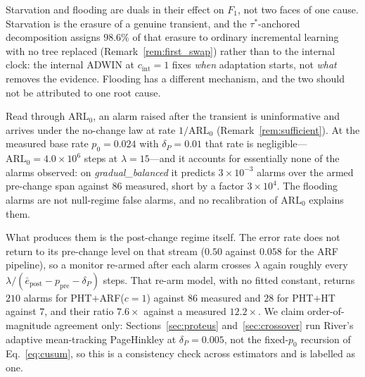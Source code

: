 \documentclass[smallextended]{svjour3}
\newcommand{\DeltaPtext}{0.01}               %
\newcommand{\LambdaFA}{15}                   %
\newcommand{\LearnSharePure}{98.6}           %
\newcommand{\PzeroMeas}{0.024}               %
\newcommand{\ArlFifteen}{4.0\times10^{6}}    %
\newcommand{\FloodPredArf}{210}              %
\newcommand{\FloodPredHt}{28}                %
\newcommand{\FloodArlGap}{3\times10^{4}}     %
\begin{document}
\begin{remark}\label{rem:flooding}
  Starvation and flooding are duals in their effect on $F_1$, not two faces of one cause. Starvation is the erasure of a genuine transient, and the $\tau^*$-anchored decomposition assigns $\LearnSharePure\%$ of that erasure to ordinary incremental learning with no tree replaced (Remark~\ref{rem:first_swap}) rather than to the internal clock: the internal ADWIN at $c_{\mathrm{int}}{=}1$ fixes \emph{when} adaptation starts, not \emph{what} removes the evidence. Flooding has a different mechanism, and the two should not be attributed to one root cause.

  Read through $\mathrm{ARL}_0$, an alarm raised after the transient is uninformative and arrives under the no-change law at rate $1/\mathrm{ARL}_0$ (Remark~\ref{rem:sufficient}). At the measured base rate $p_0 = \PzeroMeas$ with $\delta_P = \DeltaPtext$ that rate is negligible---$\mathrm{ARL}_0 = \ArlFifteen$ steps at $\lambda = \LambdaFA$---and it accounts for essentially none of the alarms observed: on \emph{gradual\_balanced} it predicts $3\times10^{-3}$ alarms over the armed pre-change span against $86$ measured, short by a factor $\FloodArlGap$. The flooding alarms are not null-regime false alarms, and no recalibration of $\mathrm{ARL}_0$ explains them.

  What produces them is the post-change regime itself. The error rate does not return to its pre-change level on that stream ($0.50$ against $0.058$ for the ARF pipeline), so a monitor re-armed after each alarm crosses $\lambda$ again roughly every $\lambda / (\bar e_{\mathrm{post}} - p_{\mathrm{pre}} - \delta_P)$ steps. That re-arm model, with no fitted constant, returns $\FloodPredArf$ alarms for PHT$+$ARF($c{=}1$) against $86$ measured and $\FloodPredHt$ for PHT$+$HT against $7$, and their ratio $7.6\times$ against a measured $12.2\times$. We claim order-of-magnitude agreement only: Sections~\ref{sec:proteus} and~\ref{sec:crossover} run River's adaptive mean-tracking PageHinkley at $\delta_P = 0.005$, not the fixed-$p_0$ recursion of Eq.~\eqref{eq:cusum}, so this is a consistency check across estimators and is labelled as one.


\end{remark}
\end{document}
